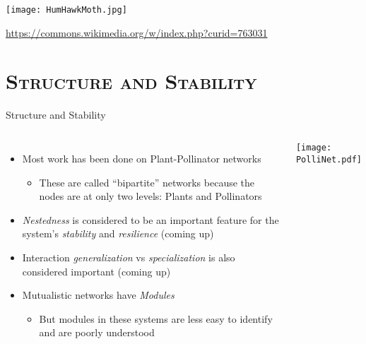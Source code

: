 \begin{frame}[plain]{}
  \begin{center}
    \texttt{[image: HumHawkMoth.jpg]}\\
    {\tiny \url{https://commons.wikimedia.org/w/index.php?curid=763031}\par }
  \end{center}
\end{frame}

\section{\scshape Structure and Stability}

\begin{frame}{Structure and Stability}

  \begin{columns}[c]
      \begin{itemize}[<+->]\setlength{\itemindent}{0em}\itemsep6pt
        \item Most work has been done on Plant-Pollinator networks
        \begin{itemize}
          \item These are called ``bipartite'' networks because the nodes are at only two levels: Plants and Pollinators
        \end{itemize}
        \item {\it Nestedness} is considered to be an important feature for the system's {\it stability} and {\it resilience} (coming up)
        \item Interaction {\it generalization} vs {\it specialization} is also considered important (coming up)
        \item Mutualistic networks have {\it Modules}\footnotemark
        \begin{itemize}
          \item But modules in these systems are less easy to identify and are poorly understood
        \end{itemize} 

      \end{itemize}
    \centering
    \texttt{[image: PolliNet.pdf]}
  \end{columns}


\end{frame}
    
